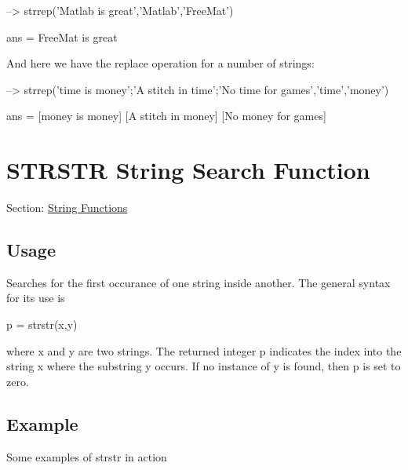 \begin{DoxyVerbInclude}
--> strrep('Matlab is great','Matlab','FreeMat')

ans = 
FreeMat is great
\end{DoxyVerbInclude}


And here we have the replace operation for a number of strings\-:


\begin{DoxyVerbInclude}
--> strrep({'time is money';'A stitch in time';'No time for games'},'time','money')

ans = 
 [money is money] 
 [A stitch in money] 
 [No money for games] 
\end{DoxyVerbInclude}
 \hypertarget{string_strstr}{}\section{S\-T\-R\-S\-T\-R String Search Function}\label{string_strstr}
Section\-: \hyperlink{sec_string}{String Functions} \hypertarget{vtkwidgets_vtkxyplotwidget_Usage}{}\subsection{Usage}\label{vtkwidgets_vtkxyplotwidget_Usage}
Searches for the first occurance of one string inside another. The general syntax for its use is \begin{DoxyVerb}   p = strstr(x,y)
\end{DoxyVerb}
 where {\ttfamily x} and {\ttfamily y} are two strings. The returned integer {\ttfamily p} indicates the index into the string {\ttfamily x} where the substring {\ttfamily y} occurs. If no instance of {\ttfamily y} is found, then {\ttfamily p} is set to zero. \hypertarget{variables_struct_Example}{}\subsection{Example}\label{variables_struct_Example}
Some examples of {\ttfamily strstr} in action


